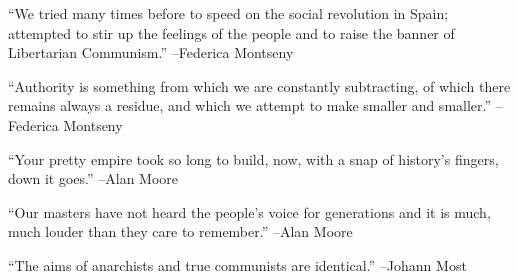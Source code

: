 \documentclass{article}%
\begin{document}
\linebreak%
\vspace{1mm}%
\begin{minipage}{\textwidth}%
\flushleft%
“We tried many times before to speed on the social revolution in Spain; attempted to stir up the feelings of the people and to raise the banner of Libertarian Communism.”%
\linebreak%
\vspace{1mm}%
–Federica Montseny%
\linebreak%
\vspace{1mm}%
\end{minipage}%
\linebreak%
\vspace{1mm}%
\begin{minipage}{\textwidth}%
\flushleft%
“Authority is something from which we are constantly subtracting, of which there remains always a residue, and which we attempt to make smaller and smaller.”%
\linebreak%
\vspace{1mm}%
–Federica Montseny%
\linebreak%
\vspace{1mm}%
\end{minipage}%
\linebreak%
\vspace{1mm}%
\begin{minipage}{\textwidth}%
\flushleft%
“Your pretty empire took so long to build, now, with a snap of history's fingers, down it goes.”%
\linebreak%
\vspace{1mm}%
–Alan Moore%
\linebreak%
\vspace{1mm}%
\end{minipage}%
\linebreak%
\vspace{1mm}%
\begin{minipage}{\textwidth}%
\flushleft%
“Our masters have not heard the people's voice for generations and it is much, much louder than they care to remember.”%
\linebreak%
\vspace{1mm}%
–Alan Moore%
\linebreak%
\vspace{1mm}%
\end{minipage}%
\linebreak%
\vspace{1mm}%
\begin{minipage}{\textwidth}%
\flushleft%
“The aims of anarchists and true communists are identical.”%
\linebreak%
\vspace{1mm}%
–Johann Most%
\linebreak%
\vspace{1mm}%
\end{minipage}%
\end{document}
